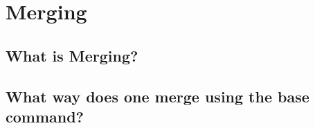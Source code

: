 \chapter{Merging}
\chapteroverlay
\section{What is Merging?}
\section{What way does one merge using the base command?}
